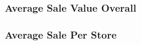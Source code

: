 \documentclass{article}
\begin{document}

            \subsubsection{Average Sale Value Overall}
            \subsubsection{Average Sale Per Store}


\end{document}
